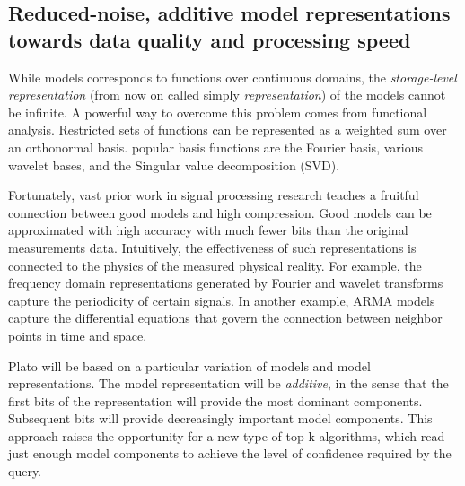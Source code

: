 \subsection{Reduced-noise, additive model representations towards data quality and processing speed}
\label{sec:reduced-noise-additive}

While models corresponds to functions over continuous domains, the
{\em storage-level representation} (from now on called simply {\em
  representation}) of the models cannot be infinite. A powerful way to
overcome this problem comes from functional analysis. Restricted sets
of functions can be represented as a weighted sum over an
orthonormal basis. popular basis functions are the Fourier basis,
various wavelet bases, and the Singular value decomposition (SVD).

Fortunately, vast prior work in signal processing research teaches a
fruitful connection between good models and high compression. Good
models can be approximated with high accuracy with much fewer bits
than the original measurements data. Intuitively, the effectiveness of
such representations is connected to the physics of the measured
physical reality. For example, the frequency domain representations
generated by Fourier and wavelet transforms capture the periodicity of
certain signals. In another example, ARMA models capture the
differential equations that govern the connection between neighbor
points in time and space.

Plato will be based on a particular variation of models and model representations. The model representation will be {\em additive}, in the sense that the first bits of the representation will provide the most dominant components. Subsequent bits will provide decreasingly important model components. This approach raises the opportunity for a new type of top-k algorithms, which read just enough model components to achieve the level of confidence required by the query.

